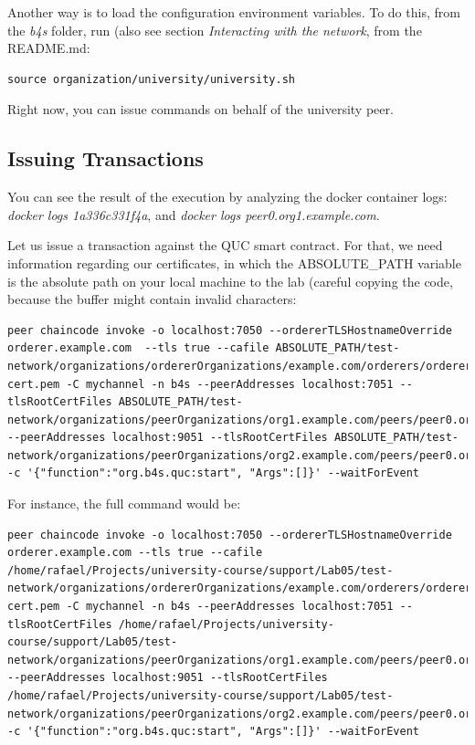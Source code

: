 \documentclass[12pt,a4paper]{article}
\theoremstyle{definition}
\begin{document}
Another way is to load the configuration environment variables. To do this, from the \emph{b4s} folder, run (also see section \emph{Interacting with the network}, from the README.md:

\begin{verbatim}
source organization/university/university.sh
\end{verbatim}

Right now, you can issue commands on behalf of the university peer. 

\subsection{Issuing Transactions}

You can see the result of the execution by analyzing the docker container logs: \emph{docker logs 1a336c331f4a}, and \emph{docker logs peer0.org1.example.com}.

Let us issue a transaction against the QUC smart contract. For that, we need information regarding our certificates, in which the ABSOLUTE\_PATH variable is the absolute path on your local machine to the lab (careful copying the code, because the buffer might contain invalid characters:


\begin{verbatim}
peer chaincode invoke -o localhost:7050 --ordererTLSHostnameOverride orderer.example.com  --tls true --cafile ABSOLUTE_PATH/test-network/organizations/ordererOrganizations/example.com/orderers/orderer.example.com/msp/tlscacerts/tlsca.example.com-cert.pem -C mychannel -n b4s --peerAddresses localhost:7051 --tlsRootCertFiles ABSOLUTE_PATH/test-network/organizations/peerOrganizations/org1.example.com/peers/peer0.org1.example.com/tls/ca.crt --peerAddresses localhost:9051 --tlsRootCertFiles ABSOLUTE_PATH/test-network/organizations/peerOrganizations/org2.example.com/peers/peer0.org2.example.com/tls/ca.crt -c '{"function":"org.b4s.quc:start", "Args":[]}' --waitForEvent
\end{verbatim}

For instance, the full command would be:
\begin{verbatim}
peer chaincode invoke -o localhost:7050 --ordererTLSHostnameOverride orderer.example.com --tls true --cafile /home/rafael/Projects/university-course/support/Lab05/test-network/organizations/ordererOrganizations/example.com/orderers/orderer.example.com/msp/tlscacerts/tlsca.example.com-cert.pem -C mychannel -n b4s --peerAddresses localhost:7051 --tlsRootCertFiles /home/rafael/Projects/university-course/support/Lab05/test-network/organizations/peerOrganizations/org1.example.com/peers/peer0.org1.example.com/tls/ca.crt --peerAddresses localhost:9051 --tlsRootCertFiles /home/rafael/Projects/university-course/support/Lab05/test-network/organizations/peerOrganizations/org2.example.com/peers/peer0.org2.example.com/tls/ca.crt -c '{"function":"org.b4s.quc:start", "Args":[]}' --waitForEvent
\end{verbatim}
\end{document}
